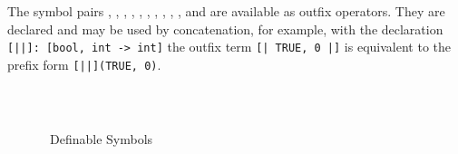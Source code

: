 The symbol pairs \lit{[|} \lit{|]}, \lit{(|} \lit{|)}, 
\lit{$\{$|} \lit{|$\}$},  ,  ,
 ,  ,  ,
 ,  , and   are
available as outfix operators.  They are
declared and may be used by concatenation,
for example, with the declaration \texttt{[||]:\ [bool, int -> int]} the
outfix term \texttt{[| TRUE, 0 |]} is equivalent to the prefix form
\texttt{[||](TRUE, 0)}.

\begin{figure}[tb]
\begin{center}
\renewcommand{\arraystretch}{1.2}
{\small\tt
\begin{tabular}{|*{6}{@{\hspace*{.2in}}c@{}}@{\hspace*{.2in}}|}\hline

\hline
\end{tabular}}
\end{center}
\caption{\pvs\ Definable Symbols}\label{definable-symbols}
\end{figure}

